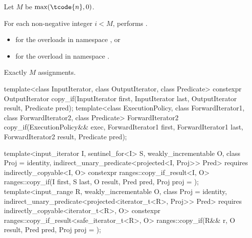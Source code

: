 \begin{itemdescr}
\pnum
Let $M$ be $\max(\tcode{n}, 0)$.

\pnum
\effects
For each non-negative integer $i < M$,
performs .

\pnum
\returns
\begin{itemize}
\item
  for the overloads in namespace , or
\item
  for the overload in namespace .
\end{itemize}

\pnum
\complexity
Exactly $M$ assignments.
\end{itemdescr}

%
\begin{itemdecl}
template<class InputIterator, class OutputIterator, class Predicate>
  constexpr OutputIterator copy_if(InputIterator first, InputIterator last,
                                   OutputIterator result, Predicate pred);
template<class ExecutionPolicy, class ForwardIterator1, class ForwardIterator2,
         class Predicate>
  ForwardIterator2 copy_if(ExecutionPolicy&& exec,
                           ForwardIterator1 first, ForwardIterator1 last,
                           ForwardIterator2 result, Predicate pred);

template<input_iterator I, sentinel_for<I> S, weakly_incrementable O, class Proj = identity,
         indirect_unary_predicate<projected<I, Proj>> Pred>
  requires indirectly_copyable<I, O>
  constexpr ranges::copy_if_result<I, O>
    ranges::copy_if(I first, S last, O result, Pred pred, Proj proj = {});
template<input_range R, weakly_incrementable O, class Proj = identity,
         indirect_unary_predicate<projected<iterator_t<R>, Proj>> Pred>
  requires indirectly_copyable<iterator_t<R>, O>
  constexpr ranges::copy_if_result<safe_iterator_t<R>, O>
    ranges::copy_if(R&& r, O result, Pred pred, Proj proj = {});
\end{itemdecl}


